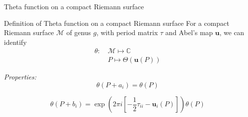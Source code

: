 \documentclass[11pt,aspectratio=169]{beamer}
\begin{document}
\begin{frame}{Theta function on a compact Riemann surface}
    \begin{block}{Definition of Theta function on a compact Riemann surface}
        For a compact Riemann surface $\mathcal M$ of genus $g$, with period matrix $\tau$ and Abel's map $\mathbf{u}$, we can identify
        \begin{align*}
            \theta : \ & \mathcal M \mapsto \mathbb C \\
            & P \mapsto \Theta(\mathbf{u}(P))
        \end{align*}
    \end{block}

    \emph{Properties:}
    \[ \theta(P + a_i) = \theta(P) \]

    \[ \theta(P + b_i) = \exp\left(2\pi i\left[- \frac{1}{2} \tau_{ii} - \mathbf{u}_i(P) \right]\right)\theta(P) \]
\end{frame}
\end{document}
